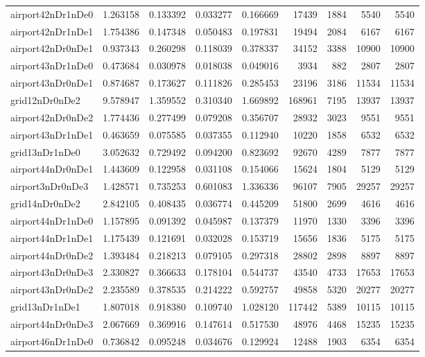 \documentclass[../../../thesis.tex]{subfiles}
\begin{document}
\begin{longtable}{|l|r|r|r|r|r|r|r|r|}
airport42nDr1nDe0 & 1.263158 & 0.133392 & 0.033277 & 0.166669 & 17439 & 1884 & 5540 & 5540 \\
airport42nDr1nDe1 & 1.754386 & 0.147348 & 0.050483 & 0.197831 & 19494 & 2084 & 6167 & 6167 \\
airport42nDr0nDe1 & 0.937343 & 0.260298 & 0.118039 & 0.378337 & 34152 & 3388 & 10900 & 10900 \\
airport43nDr1nDe0 & 0.473684 & 0.030978 & 0.018038 & 0.049016 & 3934 & 882 & 2807 & 2807 \\
airport43nDr0nDe1 & 0.874687 & 0.173627 & 0.111826 & 0.285453 & 23196 & 3186 & 11534 & 11534 \\
grid12nDr0nDe2 & 9.578947 & 1.359552 & 0.310340 & 1.669892 & 168961 & 7195 & 13937 & 13937 \\
airport42nDr0nDe2 & 1.774436 & 0.277499 & 0.079208 & 0.356707 & 28932 & 3023 & 9551 & 9551 \\
airport43nDr1nDe1 & 0.463659 & 0.075585 & 0.037355 & 0.112940 & 10220 & 1858 & 6532 & 6532 \\
grid13nDr1nDe0 & 3.052632 & 0.729492 & 0.094200 & 0.823692 & 92670 & 4289 & 7877 & 7877 \\
airport44nDr0nDe1 & 1.443609 & 0.122958 & 0.031108 & 0.154066 & 15624 & 1804 & 5129 & 5129 \\
airport3nDr0nDe3 & 1.428571 & 0.735253 & 0.601083 & 1.336336 & 96107 & 7905 & 29257 & 29257 \\
grid14nDr0nDe2 & 2.842105 & 0.408435 & 0.036774 & 0.445209 & 51800 & 2699 & 4616 & 4616 \\
airport44nDr1nDe0 & 1.157895 & 0.091392 & 0.045987 & 0.137379 & 11970 & 1330 & 3396 & 3396 \\
airport44nDr1nDe1 & 1.175439 & 0.121691 & 0.032028 & 0.153719 & 15656 & 1836 & 5175 & 5175 \\
airport44nDr0nDe2 & 1.393484 & 0.218213 & 0.079105 & 0.297318 & 28802 & 2898 & 8897 & 8897 \\
airport43nDr0nDe3 & 2.330827 & 0.366633 & 0.178104 & 0.544737 & 43540 & 4733 & 17653 & 17653 \\
airport43nDr0nDe2 & 2.235589 & 0.378535 & 0.214222 & 0.592757 & 49858 & 5320 & 20277 & 20277 \\
grid13nDr1nDe1 & 1.807018 & 0.918380 & 0.109740 & 1.028120 & 117442 & 5389 & 10115 & 10115 \\
airport44nDr0nDe3 & 2.067669 & 0.369916 & 0.147614 & 0.517530 & 48976 & 4468 & 15235 & 15235 \\
airport46nDr1nDe0 & 0.736842 & 0.095248 & 0.034676 & 0.129924 & 12488 & 1903 & 6354 & 6354 \\

\end{longtable}
\end{document}
